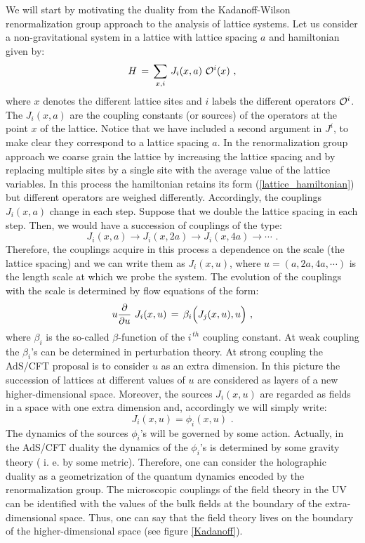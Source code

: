 \documentclass[12pt,notitlepage,a4paper]{article}
\newcommand{\beq}{\begin{equation}}
\newcommand{\eeq}{\end{equation}}
\begin{document}
We will start by motivating the duality from the Kadanoff-Wilson renormalization group approach to the analysis of lattice systems. Let us consider a non-gravitational system in a lattice with lattice spacing $a$ and hamiltonian given by:
\beq
H\,=\,\sum_{x,i}\,J_i(x,a)\,\,{\cal O}^i(x)\,\,,
\label{lattice_hamiltonian}
\eeq
where $x$ denotes the different lattice sites and $i$ labels the different operators ${\cal O}^i$. The $J_i(x,a)$ are the coupling constants (or sources) of the operators at the point $x$ of the lattice. Notice that we have included a second argument in $J^i$, to make clear  they correspond to a lattice spacing $a$. In the renormalization group approach we coarse grain the lattice by increasing the lattice spacing and by replacing multiple sites by a single site with the average value of the lattice variables. In this process the hamiltonian retains its form (\ref{lattice_hamiltonian}) but different operators are weighed differently. Accordingly, the couplings $J_i(x,a)$ change in each step. Suppose that we double the lattice spacing in each step. Then, we would have a succession of couplings of the type:
\beq
J_i(x,a)\to J_i(x,2a)\to J_i(x,4a)\to\cdots\,\,.
\eeq
Therefore, the couplings acquire in this process a dependence on the scale (the lattice spacing) and we can write them as $J_i(x,u)$, where $u=(a,2a,4a,\cdots)$ is the length scale at which we probe the system.  The evolution of the couplings with the scale is determined by flow equations of the form:
\beq
u{\partial \over \partial u}\,\,J_i(x,u)\,=\,
\beta_i\Big(J_j(x,u),u\Big)\,\,,
\eeq
where $\beta_i$ is the so-called $\beta$-function of the $i^{\,th}$ coupling constant. At weak coupling the  $\beta_i$'s  can be determined in perturbation theory. At strong coupling the AdS/CFT proposal is to consider $u$ as an extra dimension. In this picture the succession of lattices at different values of $u$ are considered as layers of a new higher-dimensional space. Moreover, the sources $J_i(x,u)$ are regarded as fields in a space with one extra dimension and, accordingly we will simply write:
\beq
J_i(x,u)=\phi_i(x,u)\,\,.
\eeq
The dynamics of the  sources $\phi_i$'s will be governed by some action. Actually, in the AdS/CFT duality the dynamics of the  $\phi_i$'s is determined by some gravity theory ( i. e. by some metric). Therefore, one can consider the holographic duality as a geometrization of the quantum dynamics encoded by the renormalization group. The microscopic couplings of the field theory in the UV can be identified with the values of the bulk fields at the boundary of the extra-dimensional space. Thus, one can say that the field theory lives on the boundary of the higher-dimensional space (see figure \ref{Kadanoff}). 
\end{document}
